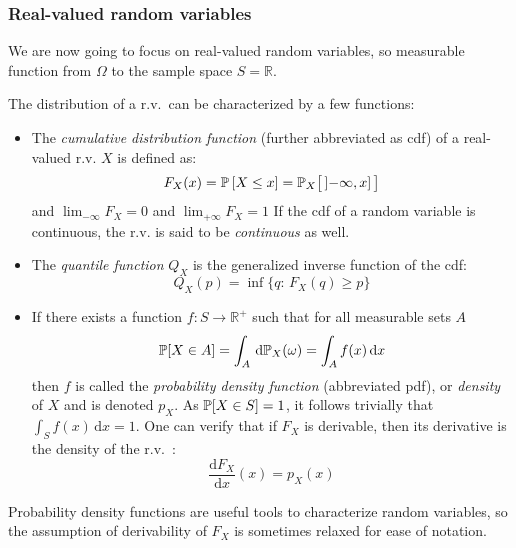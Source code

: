 \documentclass[../../Main_ManuscritThese.tex]{subfiles}
\begin{document}
\subsubsection{Real-valued random variables}
We are now going to focus on real-valued random variables, so
measurable function from $\Omega$ to the sample space
$S = \mathbb{R}$.
\begin{definition}
  \label{def:distribution}
  The distribution of a r.v.\ can be characterized by a few functions:
  \begin{itemize}
  \item The \emph{cumulative distribution function} (further
abbreviated as cdf) of a real-valued r.v. $X$ is defined as:
  \begin{equation} F_{X}(x) = \Prob\left[X \leq x\right] =
\Prob_X\big[\,\interval[open left]{-\infty}{x}\, \big]
  \end{equation} and $\lim_{-\infty}F_X = 0$ and $\lim_{+\infty} F_X
= 1$
If the cdf of a random variable is continuous, the r.v. is said to be \emph{continuous} as well.
  
\item The \emph{quantile function} $Q_X$ is the generalized inverse function
of the cdf:
  \begin{equation} Q_X(p) = \inf\{q:\, F_X(q)\geq p\}
  \end{equation}
\item If there exists a function $f: S\rightarrow \mathbb{R}^{+}$ such that
  for all measurable sets $A$
  \begin{equation} \mathbb{P}[X \in A] = \int_A \,\mathrm{d}\mathbb{P}_X(\omega) = \int_A f(x)\,\mathrm{d}x
\end{equation}
then $f$ is called the \emph{probability density function}
(abbreviated pdf), or \emph{density} of $X$ and is denoted $p_X$.  As
$\mathbb{P}[X \in S] = 1$, it follows trivially that
$\int_{S}f(x)\,\mathrm{d}x=1$.  One can verify that if $F_X$ is
derivable, then its derivative is the density of the r.v.\ :
\begin{equation}
  \label{eq:def_pdf_derivative_cdf}
  \frac{\mathrm{d}F_X}{\mathrm{d}x}(x) = p_X(x)
\end{equation}

  \end{itemize}
\end{definition}

Probability density functions are useful tools to characterize random
variables, so the assumption of derivability of $F_X$ is sometimes
relaxed for ease of notation.
\end{document}
